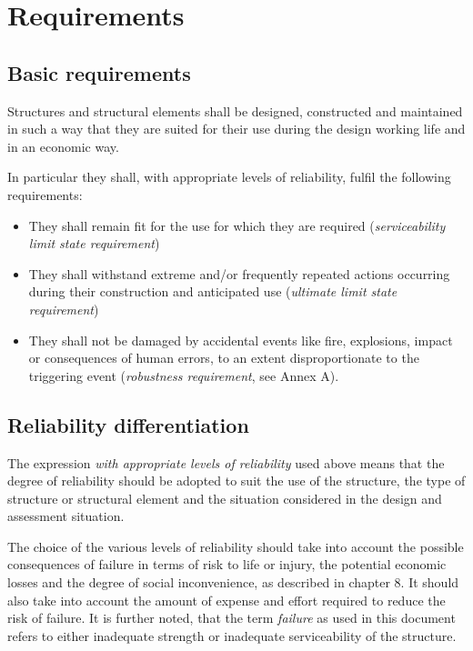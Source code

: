 \documentclass[%
oneside,                 %
final,                   %
10pt]{article}
\begin{document}
\tableofcontents


\vspace{1cm} %







\section{Requirements}
\label{chap:requ}

\subsection{Basic requirements}
Structures and structural elements shall be designed, constructed and maintained in such a way that they are suited for their use during the design working life and in an economic way.

In particular they shall, with appropriate levels of reliability, fulfil the following requirements:
\begin{itemize}
\item They shall remain fit for the use for which they are required (\emph{serviceability limit state requirement})

\item They shall withstand extreme and/or frequently repeated actions occurring during their construction and anticipated use (\emph{ultimate limit state requirement})

\item They shall not be damaged by accidental events like fire, explosions, impact or consequences of human errors, to an extent disproportionate to the triggering event (\emph{robustness requirement}, see Annex A).
\end{itemize}

\noindent
\subsection{Reliability differentiation}
The expression \emph{with appropriate levels of reliability} used above means that the degree of reliability should be adopted to suit the use of the structure, the type of structure or structural element and the situation considered in the design and assessment situation.

The choice of the various levels of reliability should take into account the possible consequences of failure in terms of risk to life or injury, the potential economic losses and the degree of social inconvenience, as described in chapter 8. It should also take into account the amount of expense and effort required to reduce the risk of failure. It is further noted, that the term \emph{failure} as used in this document refers to either inadequate strength or inadequate serviceability of the structure.
\end{document}
